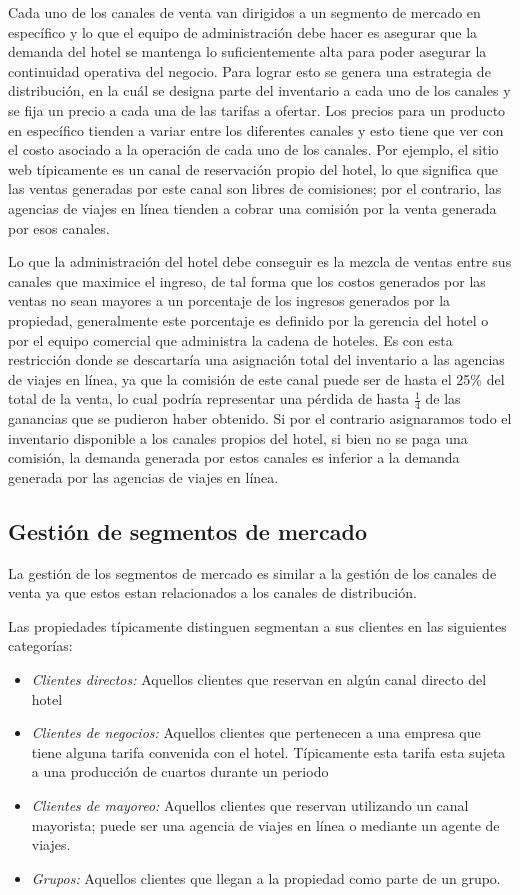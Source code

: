 Cada uno de los canales de venta van dirigidos a un segmento de mercado en específico y lo que el equipo de administración debe hacer es asegurar que la demanda del hotel se mantenga lo suficientemente alta para poder asegurar la continuidad operativa del negocio. Para lograr esto se genera una estrategia de distribución, en la cuál se designa parte del inventario a cada uno de los canales y se fija un precio a cada una de las tarifas a ofertar. Los precios para un producto en específico tienden a variar entre los diferentes canales y esto tiene que ver con el costo asociado a la operación de cada uno de los canales. Por ejemplo, el sitio web típicamente es un canal de reservación propio del hotel, lo que significa que las ventas generadas por este canal son libres de comisiones; por el contrario, las agencias de viajes en línea tienden a cobrar una comisión por la venta generada por esos canales.

Lo que la administración del hotel debe conseguir es la mezcla de ventas entre sus canales que maximice el ingreso, de tal forma que los costos generados por las ventas no sean mayores a un porcentaje de los ingresos generados por la propiedad, generalmente este porcentaje es definido por la gerencia del hotel o por el equipo comercial que administra la cadena de hoteles. Es con esta restricción donde se descartaría una asignación total del inventario a las agencias de viajes en línea, ya que la comisión de este canal puede ser de hasta el 25\% del total de la venta, lo cual podría representar una pérdida de hasta $\frac{1}{4}$ de las ganancias que se pudieron haber obtenido. Si por el contrario asignaramos todo el inventario disponible a los canales propios del hotel, si bien no se paga una comisión, la demanda generada por estos canales es inferior a la demanda generada por las agencias de viajes en línea.

\subsection*{Gestión de segmentos de mercado}

La gestión de los segmentos de mercado es similar a la gestión de los canales de venta ya que estos estan relacionados a los canales de distribución. 

Las propiedades típicamente distinguen segmentan a sus clientes en las siguientes categorías:

\begin{itemize}
  \item \emph{Clientes directos:} Aquellos clientes que reservan en algún canal directo del hotel
  \item \emph{Clientes de negocios:} Aquellos clientes que pertenecen a una empresa que tiene alguna tarifa convenida con el hotel. Típicamente esta tarifa esta sujeta a una producción de cuartos durante un periodo
  \item \emph{Clientes de mayoreo:} Aquellos clientes que reservan utilizando un canal mayorista; puede ser una agencia de viajes en línea o mediante un agente de viajes.
  \item \emph{Grupos:} Aquellos clientes que llegan a la propiedad como parte de un grupo.
\end{itemize}

